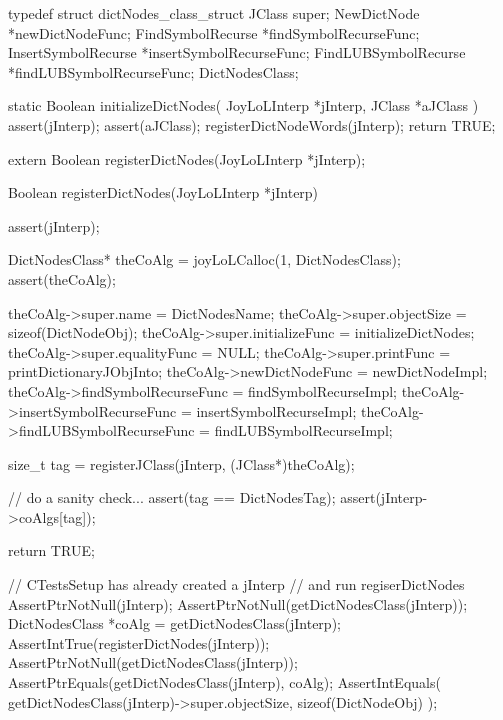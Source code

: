 \startTestSuite[registerDictNodes]

\startCHeader
typedef struct dictNodes_class_struct {
  JClass super;
  NewDictNode          *newDictNodeFunc;
  FindSymbolRecurse    *findSymbolRecurseFunc;
  InsertSymbolRecurse  *insertSymbolRecurseFunc;
  FindLUBSymbolRecurse *findLUBSymbolRecurseFunc;
} DictNodesClass;
\stopCHeader

\startCCode
static Boolean initializeDictNodes(
  JoyLoLInterp *jInterp,
  JClass   *aJClass
) {
  assert(jInterp);
  assert(aJClass);
  registerDictNodeWords(jInterp);
  return TRUE;
}
\stopCCode

\startCHeader
extern Boolean registerDictNodes(JoyLoLInterp *jInterp);
\stopCHeader
{}

\startCCode
Boolean registerDictNodes(JoyLoLInterp *jInterp) {
  assert(jInterp);
  
  DictNodesClass* theCoAlg =
    joyLoLCalloc(1, DictNodesClass);
  assert(theCoAlg);
  
  theCoAlg->super.name            = DictNodesName;
  theCoAlg->super.objectSize      = sizeof(DictNodeObj);
  theCoAlg->super.initializeFunc  = initializeDictNodes;
  theCoAlg->super.equalityFunc    = NULL;
  theCoAlg->super.printFunc       = printDictionaryJObjInto;
  theCoAlg->newDictNodeFunc       = newDictNodeImpl;
  theCoAlg->findSymbolRecurseFunc = findSymbolRecurseImpl;
  theCoAlg->insertSymbolRecurseFunc =
    insertSymbolRecurseImpl;
  theCoAlg->findLUBSymbolRecurseFunc =
    findLUBSymbolRecurseImpl;

  size_t tag =
    registerJClass(jInterp, (JClass*)theCoAlg);
  
  // do a sanity check...
  assert(tag == DictNodesTag);
  assert(jInterp->coAlgs[tag]);
    
  return TRUE;
}
\stopCCode


\startCTest
  // CTestsSetup has already created a jInterp
  // and run regiserDictNodes
  AssertPtrNotNull(jInterp);
  AssertPtrNotNull(getDictNodesClass(jInterp));
  DictNodesClass *coAlg =
    getDictNodesClass(jInterp);
  AssertIntTrue(registerDictNodes(jInterp));
  AssertPtrNotNull(getDictNodesClass(jInterp));
  AssertPtrEquals(getDictNodesClass(jInterp), coAlg);
  AssertIntEquals(
    getDictNodesClass(jInterp)->super.objectSize, 
    sizeof(DictNodeObj)
  );
\stopCTest
\stopTestCase
\stopTestSuite

